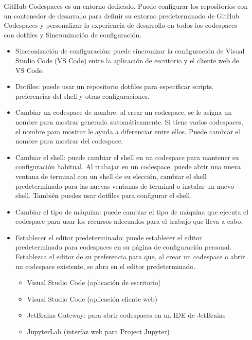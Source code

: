GitHub Codespaces es un entorno dedicado. Puede configurar los repositorios con un contenedor 
de desarrollo para definir su entorno predeterminado de GitHub Codespaces y personalizar la experiencia 
de desarrollo en todos los codespaces con dotfiles y Sincronización de configuración.


\begin{itemize}
    \item Sincronización de configuración: puede sincronizar la configuración de Visual Studio Code (VS Code) entre la aplicación de escritorio y el cliente web de VS Code.
    \item Dotfiles: puede usar un repositorio dotfiles para especificar scripts, preferencias del shell y otras configuraciones.
    \item Cambiar un codespace de nombre: al crear un codespace, se le asigna un nombre para mostrar generado automáticamente. Si tiene varios codespaces, el nombre para mostrar le ayuda a diferenciar entre ellos. Puede cambiar el nombre para mostrar del codespace.
    \item Cambiar el shell: puede cambiar el shell en un codespace para mantener su configuración habitual. Al trabajar en un codespace, puede abrir una nueva ventana de terminal con un shell de su elección, cambiar el shell predeterminado para las nuevas ventanas de terminal o instalar un nuevo shell. También puedes usar dotfiles para configurar el shell.
    \item Cambiar el tipo de máquina: puede cambiar el tipo de máquina que ejecuta el codespace para usar los recursos adecuados para el trabajo que lleva a cabo.
    \item Establecer el editor predeterminado: puede establecer el editor predeterminado para codespaces en su página de configuración personal. Establezca el editor de su preferencia para que, al crear un codespace o abrir un codespace existente, se abra en el editor predeterminado.
    \begin{itemize}
        \item Visual Studio Code (aplicación de escritorio)
        \item Visual Studio Code (aplicación cliente web)
        \item JetBrains Gateway: para abrir codespaces en un IDE de JetBrains
        \item JupyterLab (interfaz web para Project Jupyter)
    \end{itemize}    

\end{itemize}
